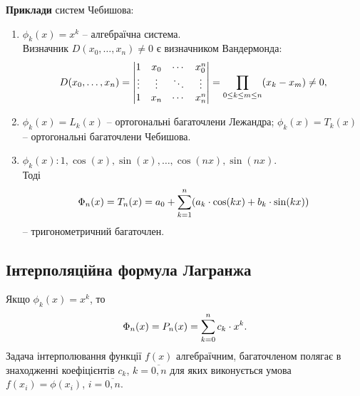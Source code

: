 \textbf{Приклади} систем Чебишова:
\begin{enumerate}
    \item $\phi_k(x) = x^k$ -- алгебраїчна система. \\

    Визначник $D(x_0, \ldots, x_n) \ne 0$ є визначником Вандермонда: \[ D(x_0, \ldots, x_n) = \begin{vmatrix} 1 & x_0 & \cdots & x_0^n \\ \vdots & \vdots & \ddots & \vdots \\ 1 & x_n & \cdots & x_n^n \end{vmatrix} = \displaystyle\prod\limits_{0 \le k \le m \le n} (x_k - x_m) \ne 0, \]
    \item $\phi_k (x) = L_k(x)$ -- ортогональні багаточлени Лежандра; $\phi_k(x) = T_k(x)$ -- ортогональні багаточлени Чебишова.
    \item $\phi_k(x): 1, \cos(x), \sin(x), \ldots, \cos(nx), \sin(nx)$.\\

    Тоді \[\Phi_n(x) = T_n(x) = a_0 + \displaystyle\sum\limits_{k=1}^n(a_k\cdot\cos(kx) + b_k\cdot\sin(kx))\] -- тригонометричний багаточлен.
\end{enumerate}
\subsection{Інтерполяційна формула Лагранжа}
Якщо $\phi_k(x) = x^k$, то \[\Phi_n(x) = P_n(x) = \displaystyle\sum\limits_{k=0}^n c_k \cdot x^k.\] Задача інтерполювання функції $f(x)$ алгебраїчним, багаточленом полягає в знаходженні коефіцієнтів $c_k$, $k = \overline{0,n}$ для яких виконується умова $f(x_i) = \phi(x_i)$, $i = \overline{0, n}$. \\

